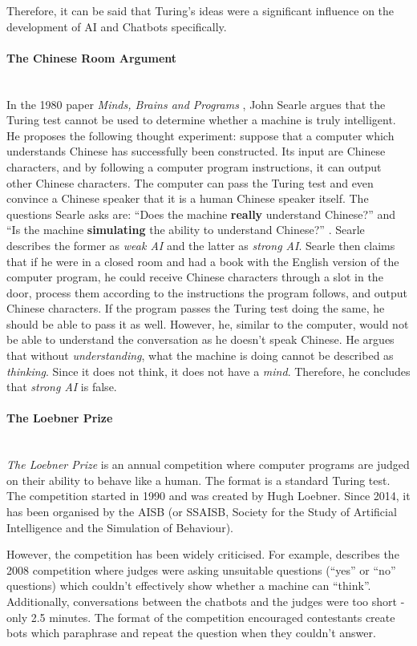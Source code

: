 \documentclass[12pt,a4paper]{article}
\newcommand{\myparagraph}[1]{\paragraph{#1}\mbox{}\\}
\begin{document}
Therefore, it can be said that Turing's ideas were a significant influence on the development of AI and Chatbots specifically.

\myparagraph{The Chinese Room Argument}
In the 1980 paper \textit{Minds, Brains and Programs} \cite{Searle1980}, John Searle argues that the Turing test cannot be used to determine whether a machine is truly intelligent. He proposes the following thought experiment: suppose that a computer which understands Chinese has successfully been constructed. Its input are Chinese characters, and by following a computer program instructions, it can output other Chinese characters. The computer can pass the Turing test and even convince a Chinese speaker that it is a human Chinese speaker itself. The questions Searle asks are: \enquote{Does the machine \textbf{really} understand Chinese?} and \enquote{Is the machine \textbf{simulating} the ability to understand Chinese?} \cite[p.~2]{Searle1980}. Searle describes the former as \textit{weak AI} and the latter as \textit{strong AI}. Searle then claims that if he were in a closed room and had a book with the English version of the computer program, he could receive Chinese characters through a slot in the door, process them according to the instructions the program follows, and output Chinese characters. If the program passes the Turing test doing the same, he should be able to pass it as well. However, he, similar to the computer, would not be able to understand the conversation as he doesn't speak Chinese. He argues that without \textit{understanding}, what the machine is doing cannot be described as \textit{thinking}. Since it does not think, it does not have a \textit{mind}. Therefore, he concludes that \textit{strong AI} is false.

\myparagraph{The Loebner Prize}
\textit{The Loebner Prize} is an annual competition where computer programs are judged on their ability to behave like a human. The format is a standard Turing test. The competition started in 1990 and was created by Hugh Loebner. Since 2014, it has been organised by the AISB (or SSAISB, Society for the Study of Artificial Intelligence and the Simulation of Behaviour).

However, the competition has been widely criticised. For example, \cite{Floridi2009} describes the 2008 competition where judges were asking unsuitable questions (\enquote{yes} or \enquote{no} questions) which couldn't effectively show whether a machine can \enquote{think}. Additionally, conversations between the chatbots and the judges were too short - only 2.5 minutes. The format of the competition encouraged contestants create bots which paraphrase and repeat the question when they couldn't answer.
\end{document}
